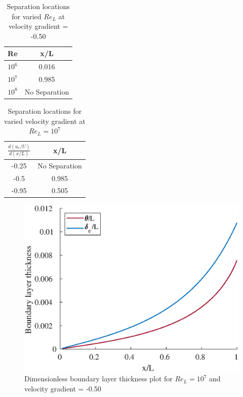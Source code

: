 


\begin{table}[H]
\centering
\begin{tabular}{c|c}
\hline
Re                    & \multicolumn{1}{c}{x/L} \\ \hline
$10^6$ & 0.016                   \\
$10^7$ & 0.985                   \\
$10^8$ & No Separation                       \\ \hline
\end{tabular}
\caption{Separation locations for varied $Re_L$ at velocity gradient = -0.50}
\end{table}

\begin{table}[H]
\centering
\begin{tabular}{c|c}
\hline
$\frac{d(u_e/U)}{d(x/L)}$ & \multicolumn{1}{c}{x/L} \\ \hline  
-0.25 & No Separation     \\
-0.5  & 0.985 \\
-0.95 & 0.505 \\ \hline
\end{tabular}
\caption{Separation locations for varied velocity gradient at $Re_L = 10^7$}
\end{table}

\begin{figure}[H]
\centering
\includegraphics[scale=0.76]{graphs/e5g1.eps}
\caption{Dimensionless boundary layer thickness plot for $Re_L = 10^7$ and velocity gradient = -0.50 }
\label{e1g1}
\end{figure}

